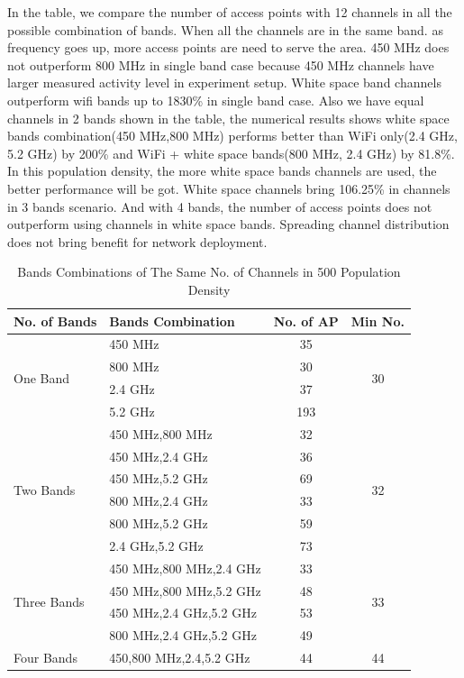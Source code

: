 In the table, we compare the number of access points with 12 channels in all the possible combination of bands.
When all the channels are in the same band. as frequency goes up, more access points 
are need to serve the area. 450 MHz does not outperform 800 MHz in single band case because 
450 MHz channels have larger measured activity level in experiment setup.
White space band channels outperform wifi bands up to 1830\% in single band case.
Also we have equal channels in 2 bands shown in the table, the numerical results shows 
white space bands combination(450 MHz,800 MHz) performs better than WiFi only(2.4 GHz, 5.2 GHz) by 200\% and 
WiFi + white space bands(800 MHz, 2.4 GHz) by 81.8\%. In this population density, the more white space bands channels are 
used, the better performance will be got. White space channels bring 106.25\% in channels in 3 bands scenario.
And with 4 bands, the number of access points does not outperform using channels in white space bands.
Spreading channel distribution does not bring benefit for network deployment.

 \begin{table}[h]
 \centering
 \begin{tabular}{|l|p{3.5cm}|c|c|}
 \hline
 No. of Bands & Bands Combination & No. of AP & Min No. \\
 \hline
 \multirow{4}{*}{One Band}    & 450 MHz  & 35  & \multirow{4}{*}{30} \\
 \cline{2-3}
                              & 800 MHz & 30  &                      \\
 \cline{2-3}
							  & 2.4 GHz & 37  &                      \\
 \cline{2-3}
							  & 5.2 GHz & 193 &                      \\ 
 \hline
 \multirow{6}{*}{Two Bands}   & 450 MHz,800 MHz & 32  & \multirow{6}{*}{32} \\
 \cline{2-3}
                              & 450 MHz,2.4 GHz & 36  &                      \\
 \cline{2-3}
							  & 450 MHz,5.2 GHz & 69  &                      \\
 \cline{2-3}
							  & 800 MHz,2.4 GHz & 33  &                      \\ 
 \cline{2-3}
							  & 800 MHz,5.2 GHz & 59  &                      \\ 
 \cline{2-3}
							  & 2.4 GHz,5.2 GHz & 73  &                      \\ 
 \hline
 \multirow{4}{*}{Three Bands} & 450 MHz,800 MHz,2.4 GHz & 33  & \multirow{4}{*}{33} \\
 \cline{2-3}
                              & 450 MHz,800 MHz,5.2 GHz & 48  &                      \\
 \cline{2-3}
							  & 450 MHz,2.4 GHz,5.2 GHz & 53  &                      \\
 \cline{2-3}
							  & 800 MHz,2.4 GHz,5.2 GHz & 49 &                      \\ 
 \hline
 Four Bands & 450,800 MHz,2.4,5.2 GHz & 44  & 44 \\
 \hline
 \end{tabular}
 \caption{Bands Combinations of The Same No. of Channels in 500 Population Density}
 \label{tab:1500comb}
 \end{table}


